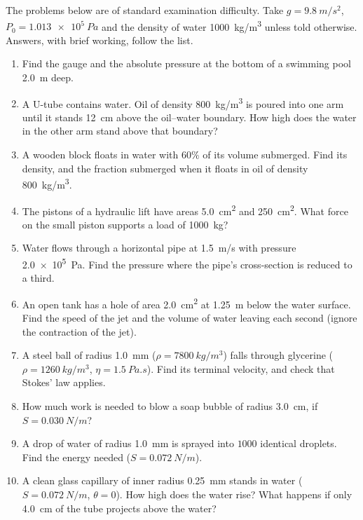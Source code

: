 The problems below are of standard examination difficulty. Take $g=\SI{9.8}{m/s^2}$,
$P_0=\SI{1.013e5}{Pa}$ and the density of water \SI{1000}{kg/m^3} unless told otherwise. Answers, with brief
working, follow the list.

\begin{enumerate}[itemsep=3pt]
\item Find the gauge and the absolute pressure at the bottom of a swimming pool \SI{2.0}{m} deep.
\item A U-tube contains water. Oil of density \SI{800}{kg/m^3} is poured into one arm until it stands
      \SI{12}{cm} above the oil--water boundary. How high does the water in the other arm stand above that
      boundary?
\item A wooden block floats in water with $60\%$ of its volume submerged. Find its density, and the fraction
      submerged when it floats in oil of density \SI{800}{kg/m^3}.
\item The pistons of a hydraulic lift have areas \SI{5.0}{cm^2} and \SI{250}{cm^2}. What force on the small
      piston supports a load of \SI{1000}{kg}?
\item Water flows through a horizontal pipe at \SI{1.5}{m/s} with pressure \SI{2.0e5}{Pa}. Find the pressure
      where the pipe's cross-section is reduced to a third.
\item An open tank has a hole of area \SI{2.0}{cm^2} at \SI{1.25}{m} below the water surface. Find the speed
      of the jet and the volume of water leaving each second (ignore the contraction of the jet).
\item A steel ball of radius \SI{1.0}{mm} ($\rho=\SI{7800}{kg/m^3}$) falls through glycerine
      ($\rho=\SI{1260}{kg/m^3}$, $\eta=\SI{1.5}{Pa.s}$). Find its terminal velocity, and check that Stokes'
      law applies.
\item How much work is needed to blow a soap bubble of radius \SI{3.0}{cm}, if $S=\SI{0.030}{N/m}$?
\item A drop of water of radius \SI{1.0}{mm} is sprayed into $1000$ identical droplets. Find the energy
      needed ($S=\SI{0.072}{N/m}$).
\item A clean glass capillary of inner radius \SI{0.25}{mm} stands in water ($S=\SI{0.072}{N/m}$,
      $\theta=0$). How high does the water rise? What happens if only \SI{4.0}{cm} of the tube projects
      above the water?
\end{enumerate}

